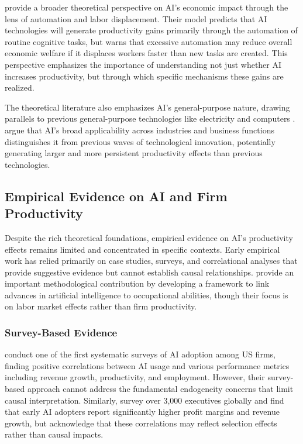 \documentclass[12pt]{article}
\begin{document}
\citet{acemoglu2018race} provide a broader theoretical perspective on AI's economic impact through the lens of automation and labor displacement. Their model predicts that AI technologies will generate productivity gains primarily through the automation of routine cognitive tasks, but warns that excessive automation may reduce overall economic welfare if it displaces workers faster than new tasks are created. This perspective emphasizes the importance of understanding not just whether AI increases productivity, but through which specific mechanisms these gains are realized.

The theoretical literature also emphasizes AI's general-purpose nature, drawing parallels to previous general-purpose technologies like electricity and computers \citep{bresnahan1995general}. \citet{goldfarb2019digital} argue that AI's broad applicability across industries and business functions distinguishes it from previous waves of technological innovation, potentially generating larger and more persistent productivity effects than previous technologies.

\subsection{Empirical Evidence on AI and Firm Productivity}

Despite the rich theoretical foundations, empirical evidence on AI's productivity effects remains limited and concentrated in specific contexts. Early empirical work has relied primarily on case studies, surveys, and correlational analyses that provide suggestive evidence but cannot establish causal relationships. \citet{felten2018occupational} provide an important methodological contribution by developing a framework to link advances in artificial intelligence to occupational abilities, though their focus is on labor market effects rather than firm productivity.

\subsubsection{Survey-Based Evidence}

\citet{brynjolfsson2017artificial} conduct one of the first systematic surveys of AI adoption among US firms, finding positive correlations between AI usage and various performance metrics including revenue growth, productivity, and employment. However, their survey-based approach cannot address the fundamental endogeneity concerns that limit causal interpretation. Similarly, \citet{mckinsey2018artificial} survey over 3,000 executives globally and find that early AI adopters report significantly higher profit margins and revenue growth, but acknowledge that these correlations may reflect selection effects rather than causal impacts.
\end{document}
